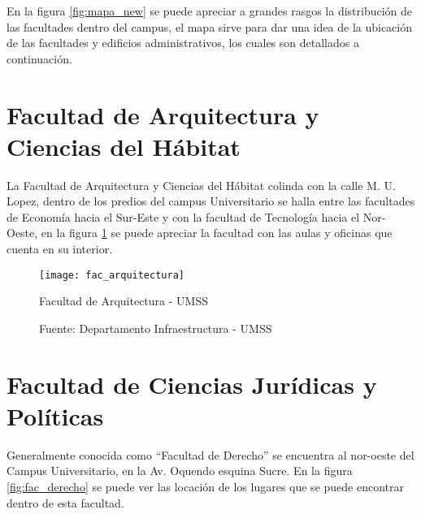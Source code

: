 En la figura \ref{fig:mapa_new} se puede apreciar a grandes rasgos la distribución de las facultades dentro del campus, el mapa sirve para dar una idea de la ubicación de las facultades y edificios administrativos, los cuales son detallados a continuación.

\section{Facultad de Arquitectura y Ciencias del Hábitat}
\label{sec:facultad_arquitectura}

    La Facultad de Arquitectura y Ciencias del Hábitat colinda con la calle M. U. Lopez, dentro de los predios del campus Universitario se halla entre las facultades de Economía hacia el Sur-Este y con la facultad de Tecnología hacia el Nor-Oeste, en la figura \ref{fig:fac_arqui} se puede apreciar la facultad con las aulas y oficinas que cuenta en su interior.\\

    \begin{figure}[H]
     \begin{center}
       \texttt{[image: fac\_arquitectura]}
       \caption{Facultad de Arquitectura - UMSS}
       \label{fig:fac_arqui}
       \caption*{Fuente: Departamento Infraestructura - UMSS}
     \end{center}
    \end{figure}




 \section{Facultad de Ciencias Jurídicas y Políticas}
 \label{sec:facultad_derecho}


 Generalmente conocida como ``Facultad de Derecho'' se encuentra al nor-oeste del Campus Universitario, en la Av. Oquendo esquina Sucre. En la figura \ref{fig:fac_derecho} se puede ver las locación de los lugares que se puede encontrar dentro de esta facultad. \\

